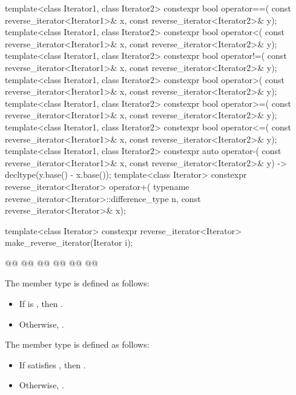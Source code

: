 \begin{codeblock}
{  template<class Iterator1, class Iterator2>
    constexpr bool operator==(
      const reverse_iterator<Iterator1>& x,
      const reverse_iterator<Iterator2>& y);
  template<class Iterator1, class Iterator2>
    constexpr bool operator<(
      const reverse_iterator<Iterator1>& x,
      const reverse_iterator<Iterator2>& y);
  template<class Iterator1, class Iterator2>
    constexpr bool operator!=(
      const reverse_iterator<Iterator1>& x,
      const reverse_iterator<Iterator2>& y);
  template<class Iterator1, class Iterator2>
    constexpr bool operator>(
      const reverse_iterator<Iterator1>& x,
      const reverse_iterator<Iterator2>& y);
  template<class Iterator1, class Iterator2>
    constexpr bool operator>=(
      const reverse_iterator<Iterator1>& x,
      const reverse_iterator<Iterator2>& y);
  template<class Iterator1, class Iterator2>
    constexpr bool operator<=(
      const reverse_iterator<Iterator1>& x,
      const reverse_iterator<Iterator2>& y);
  template<class Iterator1, class Iterator2>
    constexpr auto operator-(
      const reverse_iterator<Iterator1>& x,
      const reverse_iterator<Iterator2>& y) -> decltype(y.base() - x.base());
  template<class Iterator>
    constexpr reverse_iterator<Iterator> operator+(
      typename reverse_iterator<Iterator>::difference_type n,
      const reverse_iterator<Iterator>& x);

  template<class Iterator>
    constexpr reverse_iterator<Iterator> make_reverse_iterator(Iterator i);

  @@
    @@
      @@
    @@
                                          @@
  @\added{\}}@
}
\end{codeblock}

\begin{addedblock}
\pnum
The member type  is defined as follows:
\begin{itemize}
\item If  is
, then .
\item Otherwise, .
\end{itemize}

\pnum
The member type  is defined as follows:
\begin{itemize}
\item If  satisfies , then
.
\item Otherwise, .
\end{itemize}
\end{addedblock}


